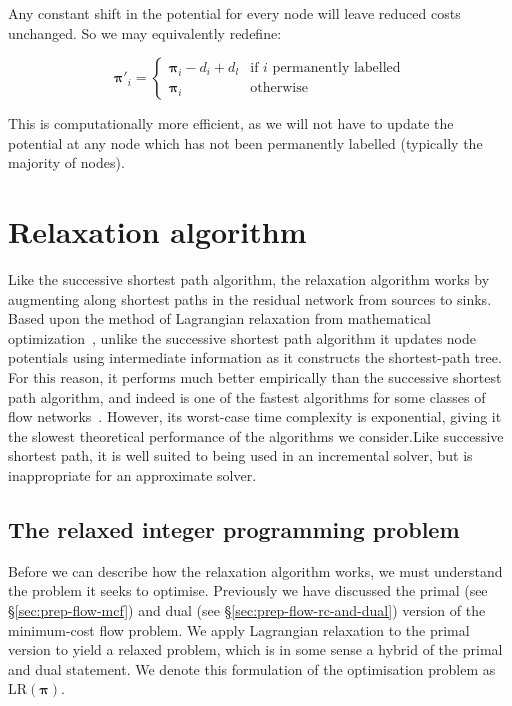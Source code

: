 Any constant shift in the potential for every node will leave reduced costs unchanged. So we may equivalently redefine:

\[\boldsymbol{\pi}'_{i}=\begin{cases}
\boldsymbol{\pi}_{i}-d_i+d_l & \text{if $i$ permanently labelled}\\
\boldsymbol{\pi}_{i} & \text{otherwise}
\end{cases}\]

This is computationally more efficient, as we will not have to update the potential at any node which has not been permanently labelled (typically the majority of nodes).

\section{Relaxation algorithm} \label{sec:impl-relax}

Like the successive shortest path algorithm, the relaxation algorithm works by augmenting along shortest paths in the residual network from sources to sinks. Based upon the method of Lagrangian relaxation from mathematical optimization~\cite[ch.~16]{Ahuja:1993}\cite{Fisher:1981}, unlike the successive shortest path algorithm it updates node potentials using intermediate information as it constructs the shortest-path tree. For this reason, it performs much better empirically than the successive shortest path algorithm, and indeed is one of the fastest algorithms for some classes of flow networks~\cite{KiralyKovacs:2012}. However, its worst-case time complexity is exponential, giving it the slowest theoretical performance of the algorithms we consider.\footnotemark Like successive shortest path, it is well suited to being used in an incremental solver, but is inappropriate for an approximate solver.


\subsection{The relaxed integer programming problem}
Before we can describe how the relaxation algorithm works, we must understand the problem it seeks to optimise. Previously we have discussed the primal (see \S\ref{sec:prep-flow-mcf}) and dual (see \S\ref{sec:prep-flow-rc-and-dual}) version of the minimum-cost flow problem. We apply Lagrangian relaxation to the primal version to yield a relaxed problem, which is in some sense a hybrid of the primal and dual statement. We denote this formulation of the optimisation problem as $\mathrm{LR}(\boldsymbol{\pi})$.

